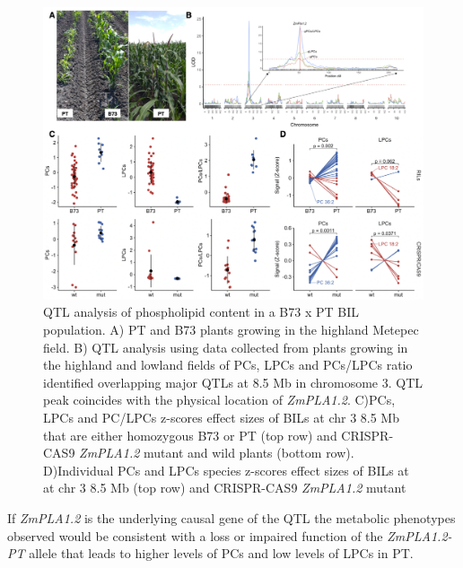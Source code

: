 \documentclass[9pt,twocolumn,twoside]{BioRxiv}
\begin{document}
\begin{figure}[h]
\begin{center}
\includegraphics[width=0.8\paperwidth]{Figures/Fig_3.png}
\caption{QTL analysis of phospholipid content in a B73 x PT BIL population. 
A) PT and B73 plants growing in the highland Metepec field. 
B) QTL analysis using data collected from plants growing in the highland and lowland fields of PCs, LPCs and PCs/LPCs ratio identified overlapping major QTLs at 8.5 Mb in chromosome 3. 
QTL peak coincides with the physical location of \textit{ZmPLA1.2}. 
C)PCs, LPCs and PC/LPCs z-scores effect sizes of BILs at chr 3 8.5 Mb that are either homozygous B73 or PT (top row) and CRISPR-CAS9 \textit{ZmPLA1.2} mutant and wild plants (bottom row).        
D)Individual PCs and LPCs species z-scores effect sizes of BILs at at chr 3 8.5 Mb (top row) and CRISPR-CAS9 \textit{ZmPLA1.2} mutant}
\label{Fig3}
\end{center}
\end{figure} 
If \textit{ZmPLA1.2} is the underlying causal gene of the QTL the metabolic phenotypes observed would be consistent with a loss or impaired function of the \textit{ZmPLA1.2-PT} allele that leads to higher levels of PCs and low levels of LPCs in PT. 
\end{document}
